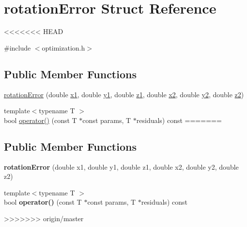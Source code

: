 \hypertarget{structrotationError}{\section{rotation\-Error Struct Reference}
\label{dd/d4e/structrotationError}
}
<<<<<<< HEAD


{\ttfamily \#include $<$optimization.\-h$>$}

\subsection*{Public Member Functions}
\begin{DoxyCompactItemize}
\item 
\hyperlink{structrotationError_aae8d21c715df1ad4f3a004eed8ba17a4}{rotation\-Error} (double \hyperlink{structrotationError_a9415ed45ed91f063e52f29ce11b61273}{x1}, double \hyperlink{structrotationError_af3636f2f2ee2e540f190eaabe268358a}{y1}, double \hyperlink{structrotationError_aef6f024e5632102285d2214ebf86a5d7}{z1}, double \hyperlink{structrotationError_ac15987a3eeed2caea868782d96446b41}{x2}, double \hyperlink{structrotationError_aef6cabe438fbe705ae5d26c96caf73f4}{y2}, double \hyperlink{structrotationError_af6db1bdce5eb86f310b3d3be803c7e40}{z2})
\item 
{\footnotesize template$<$typename T $>$ }\\bool \hyperlink{structrotationError_a14f84854efd623a56c9681ee18f95fe0}{operator()} (const T $\ast$const params, T $\ast$residuals) const 
=======
\subsection*{Public Member Functions}
\begin{DoxyCompactItemize}
\item 
\hypertarget{structrotationError_aae8d21c715df1ad4f3a004eed8ba17a4}{{\bfseries rotation\-Error} (double x1, double y1, double z1, double x2, double y2, double z2)}\label{dd/d4e/structrotationError_aae8d21c715df1ad4f3a004eed8ba17a4}

\item 
\hypertarget{structrotationError_a14f84854efd623a56c9681ee18f95fe0}{{\footnotesize template$<$typename T $>$ }\\bool {\bfseries operator()} (const T $\ast$const params, T $\ast$residuals) const }\label{dd/d4e/structrotationError_a14f84854efd623a56c9681ee18f95fe0}

>>>>>>> origin/master
\end{DoxyCompactItemize}

\end{DoxyCompactItemize}
